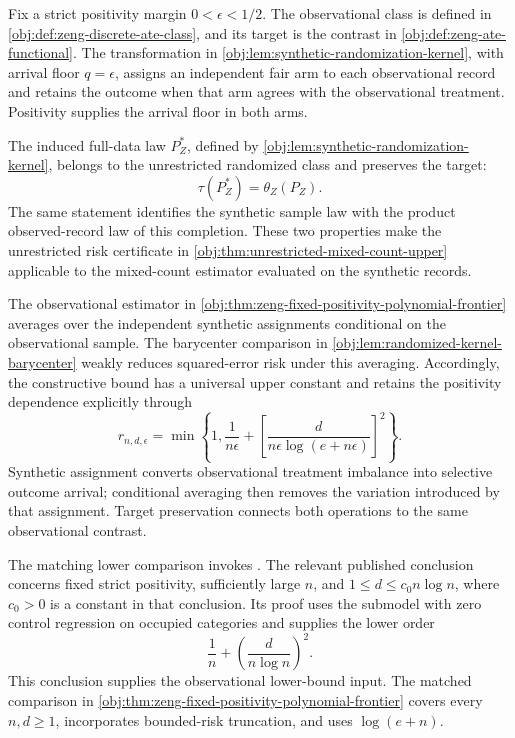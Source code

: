 \documentclass[11pt]{article}
\begin{document}
Fix a strict positivity margin \(0<\epsilon<1/2\). The observational class  is defined in \cref{obj:def:zeng-discrete-ate-class}, and its target is the contrast in \cref{obj:def:zeng-ate-functional}. The transformation in \cref{obj:lem:synthetic-randomization-kernel}, with arrival floor \(q=\epsilon\), assigns an independent fair arm to each observational record and retains the outcome when that arm agrees with the observational treatment. Positivity supplies the arrival floor in both arms.

The induced full-data law \(P_Z^*\), defined by \cref{obj:lem:synthetic-randomization-kernel}, belongs to the unrestricted randomized class and preserves the target:
\[
\tau(P_Z^*)=\theta_Z(P_Z).
\]
The same statement identifies the synthetic sample law with the product observed-record law of this completion. These two properties make the unrestricted risk certificate in \cref{obj:thm:unrestricted-mixed-count-upper} applicable to the mixed-count estimator evaluated on the synthetic records.

The observational estimator  in \cref{obj:thm:zeng-fixed-positivity-polynomial-frontier} averages over the independent synthetic assignments conditional on the observational sample. The barycenter comparison in \cref{obj:lem:randomized-kernel-barycenter} weakly reduces squared-error risk under this averaging. Accordingly, the constructive bound has a universal upper constant and retains the positivity dependence explicitly through
\[
r_{n,d,\epsilon}
=
\min\left\{
1,\frac{1}{n\epsilon}
+
\left[
\frac{d}{n\epsilon\log(e+n\epsilon)}
\right]^2
\right\}.
\]
Synthetic assignment converts observational treatment imbalance into selective outcome arrival; conditional averaging then removes the variation introduced by that assignment. Target preservation connects both operations to the same observational contrast.

The matching lower comparison invokes \citet[Theorem~2, Section~3.2, p.~9, together with its proof in Section~C.5, pp.~39--44]{ZengBalakrishnanHanKennedy2026}. The relevant published conclusion concerns fixed strict positivity, sufficiently large \(n\), and \(1\le d\le c_0n\log n\), where \(c_0>0\) is a constant in that conclusion. Its proof uses the submodel with zero control regression on occupied categories and supplies the lower order
\[
\frac1n+\left(\frac{d}{n\log n}\right)^2.
\]
This conclusion supplies the observational lower-bound input. The matched comparison in \cref{obj:thm:zeng-fixed-positivity-polynomial-frontier} covers every \(n,d\ge1\), incorporates bounded-risk truncation, and uses \(\log(e+n)\).
\end{document}
